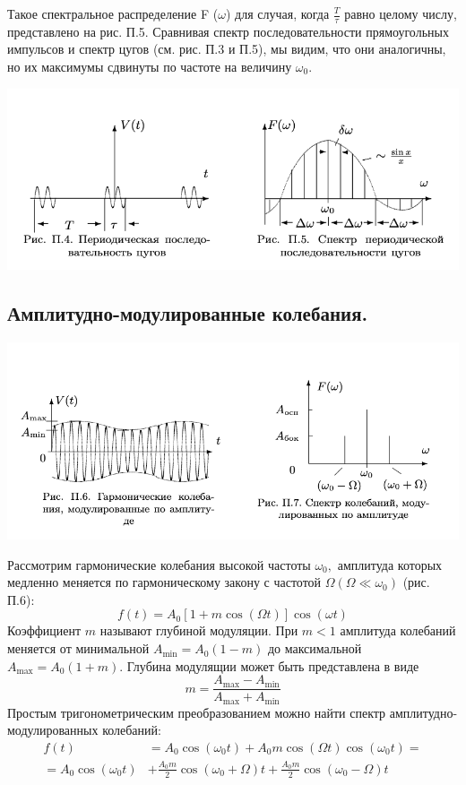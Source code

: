 \documentclass[a4paper,12pt]{article} %
\begin{document}
Такое спектральное распределение F ($\omega$) для случая, когда $\frac T\tau$ равно целому числу, представлено на рис. П.5. Сравнивая спектр последовательности прямоугольных импульсов и спектр цугов (см. рис. П.3 и П.5), мы видим, что они аналогичны, но их максимумы сдвинуты по частоте на величину $\omega_0$.

\begin{center}
\includegraphics[width=0.7\linewidth]{3.jpeg}\\
\end{center}

\subsection{Амплитудно-модулированные колебания.}

\begin{center}
\includegraphics[width=0.7\linewidth]{4.jpeg}\\
\end{center}
 Рассмотрим гармонические колебания высокой частоты $\omega_{0},$ амплитуда которых медленно меняется по гармоническому закону с частотой $\Omega\left(\Omega \ll \omega_{0}\right)$ (рис. П.6):
$$
f(t)=A_{0}[1+m \cos (\Omega t)] \cos (\omega t)
$$
Коэффициент $m$ называют глубиной модуляции. При $m<1$ амплитуда колебаний меняется от минимальной $A_{\min }=A_{0}(1-m)$ до максимальной $A_{\max }=A_{0}(1+m) .$ Глубина модулящии может быть представлена в виде
$$
m=\frac{A_{\max }-A_{\min }}{A_{\max }+A_{\min }}
$$
Простым тригонометрическим преобразованием можно найти спектр амплитудно-модулированных колебаний:
$$
\begin{aligned}
f(t) &=A_{0} \cos \left(\omega_{0} t\right)+A_{0} m \cos (\Omega t) \cos \left(\omega_{0} t\right)=\\
=A_{0} \cos \left(\omega_{0} t\right) &+\frac{A_{0} m}{2} \cos \left(\omega_{0}+\Omega\right) t+\frac{A_{0} m}{2} \cos \left(\omega_{0}-\Omega\right) t
\end{aligned}
$$
\end{document}
